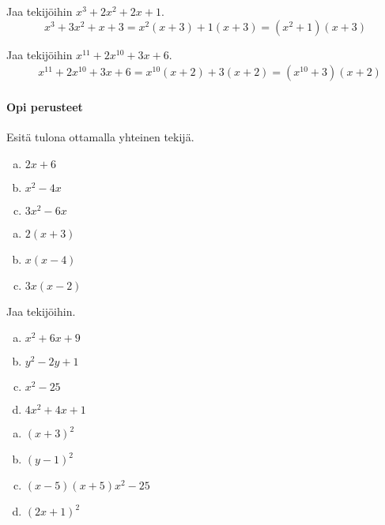 \begin{esimerkki}
Jaa tekijöihin $x^3+2x^2+2x+1$.
\begin{equation*}
x^3+3x^2+x+3=x^2(x+3)+1(x+3)=(x^2+1)(x+3)
\end{equation*}
\end{esimerkki}

\begin{esimerkki}
Jaa tekijöihin $x^{11}+2x^{10}+3x+6$.
\begin{align*}
& x^{11}+2x^{10}+3x+6=x^{10}(x+2)+3(x+2)=(x^{10}+3)(x+2)
\end{align*}
\end{esimerkki}

\Harjoitustehtavat

\paragraph*{Opi perusteet}

\begin{tehtava}
    Esitä tulona ottamalla yhteinen tekijä.
    \begin{enumerate}[a)]
        \item $2x+6$
        \item $x^2 -4x$
        \item $3x^2 - 6x$
    \end{enumerate}
    \begin{vastaus}
        \begin{enumerate}[a)]
        \item $2(x+3)$
        \item $x(x-4)$
        \item $3x(x-2)$
        \end{enumerate}
    \end{vastaus}
\end{tehtava}

\begin{tehtava}
    Jaa tekijöihin.
    \begin{enumerate}[a)]
        \item $x^2+6x+9$
        \item $y^2 - 2y+1$
        \item $x^2 -25$
        \item $4x^2 +4x +1$
    \end{enumerate}
    \begin{vastaus}
        \begin{enumerate}[a)]
        \item $(x+3)^2$
        \item $(y-1)^2$
        \item $(x-5)(x+5)x^2 -25$
        \item $(2x+1)^2$
        \end{enumerate}
    \end{vastaus}
\end{tehtava}

